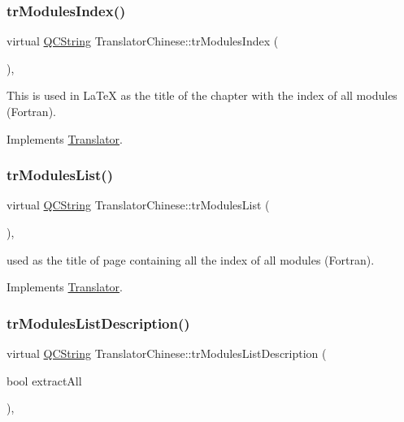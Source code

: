 \subsubsection{\texorpdfstring{trModulesIndex()}{trModulesIndex()}}
{\footnotesize\ttfamily virtual \mbox{\hyperlink{class_q_c_string}{Q\+C\+String}} Translator\+Chinese\+::tr\+Modules\+Index (\begin{DoxyParamCaption}{ }\end{DoxyParamCaption})\hspace{0.3cm}{\ttfamily [inline]}, {\ttfamily [virtual]}}

This is used in La\+TeX as the title of the chapter with the index of all modules (Fortran). 

Implements \mbox{\hyperlink{class_translator}{Translator}}.

\mbox{\label{class_translator_chinese_a392a4635cdeb71c8906f57e80e7cc131}} 
\subsubsection{\texorpdfstring{trModulesList()}{trModulesList()}}
{\footnotesize\ttfamily virtual \mbox{\hyperlink{class_q_c_string}{Q\+C\+String}} Translator\+Chinese\+::tr\+Modules\+List (\begin{DoxyParamCaption}{ }\end{DoxyParamCaption})\hspace{0.3cm}{\ttfamily [inline]}, {\ttfamily [virtual]}}

used as the title of page containing all the index of all modules (Fortran). 

Implements \mbox{\hyperlink{class_translator}{Translator}}.

\mbox{\label{class_translator_chinese_afd29bf2ca31ad924bb9c8d0baa73a0c3}} 
\subsubsection{\texorpdfstring{trModulesListDescription()}{trModulesListDescription()}}
{\footnotesize\ttfamily virtual \mbox{\hyperlink{class_q_c_string}{Q\+C\+String}} Translator\+Chinese\+::tr\+Modules\+List\+Description (\begin{DoxyParamCaption}\item[{bool}]{extract\+All }\end{DoxyParamCaption})\hspace{0.3cm}{\ttfamily [inline]}, {\ttfamily [virtual]}}

